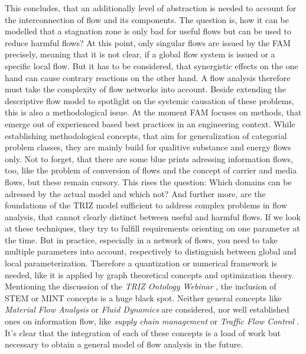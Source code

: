 \documentclass[a4paper,11pt]{article}
\begin{document}
\begin{itemize}
        This concludes, that an additionally level of abstraction is needed to 
        account for the interconnection of flow and its components. The 
        question is, how it can be modelled that a stagnation zone is only bad 
        for useful flows but can be used to reduce harmful flows? At this point,
        only singular flows are issued by the FAM precisely, meaning that it is
        not clear, if a global flow system is issued or a specific local flow.
        But it has to be considered, that synergistic effects on the one hand 
        can cause contrary reactions on the other hand. A flow analysis 
        therefore must take the complexity of flow networks into account. 
        Beside extending the descriptive flow model to spotlight on the 
        systemic causation of these problems, this is also a methodological 
        issue. At the moment FAM focuses on methods, that emerge out of 
        experienced based best practices in an engineering context. While 
        establishing methodological concepts, that aim for generalization of 
        categorial problem classes, they are mainly build for qualitive 
        substance and energy flows only. Not to forget, that there are some 
        blue prints adressing information flows, too, like the problem of 
        conversion of flows and the concept of carrier and media flows, but 
        these remain cursory. This rises the question: Which domains can be 
        adressed by the actual model and which not? And further more, are the 
        foundations of the TRIZ model sufficient to address complex problems in
        flow analysis, that cannot clearly distinct between useful and harmful 
        flows. If we look at these techniques, they try to fulfill requirements
        orienting on one parameter at the time. But in practice, especially in 
        a network of flows, you need to take multiple parameters into account, 
        respectively to distinguish between global and local parameterization. 
        Therefore a quantization or numerical framework is needed, like it is 
        applied by graph theoretical concepts and optimization theory. 
        \cite{FN} Mentioning the discussion of the \emph{TRIZ Ontology Webinar}
        \cite{TOW}, the inclusion of STEM or MINT concepts is a huge black spot. 
        Neither general concepts like \emph{Material Flow Analysis} \cite{MFA} 
        or \emph{Fluid Dynamics} \cite{FD} are considered, nor well established 
        ones on information flow, like \emph{supply chain management} or 
        \emph{Traffic Flow Control} \cite{TF}. It's clear that the integration 
        of each of these concepts is a load of work but necessary to obtain a 
        general model of flow analysis in the future.


\end{itemize}
\end{document}
